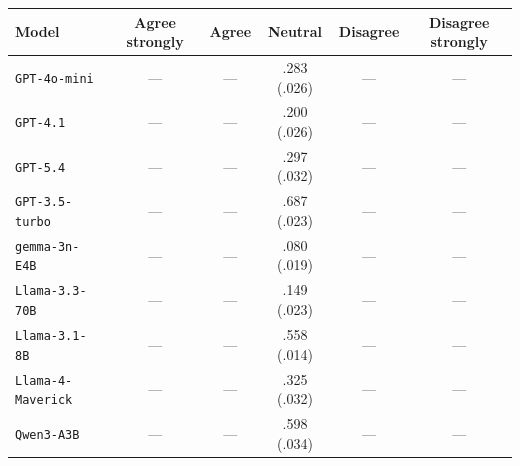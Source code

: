 \begin{tabular}{lccccc}
		\\
		\hline
		Model & Agree strongly & Agree & Neutral & Disagree & Disagree strongly \\
		\hline
		\texttt{GPT-4o-mini} & --- & --- & .283 (.026) & --- & --- \\
		\texttt{GPT-4.1} & --- & --- & .200 (.026) & --- & --- \\
		\texttt{GPT-5.4} & --- & --- & .297 (.032) & --- & --- \\
		\texttt{GPT-3.5-turbo} & --- & --- & .687 (.023) & --- & --- \\
		\texttt{gemma-3n-E4B} & --- & --- & .080 (.019) & --- & --- \\
		\texttt{Llama-3.3-70B} & --- & --- & .149 (.023) & --- & --- \\
		\texttt{Llama-3.1-8B} & --- & --- & .558 (.014) & --- & --- \\
		\texttt{Llama-4-Maverick} & --- & --- & .325 (.032) & --- & --- \\
		\texttt{Qwen3-A3B} & --- & --- & .598 (.034) & --- & --- \\
		\hline
\end{tabular}
